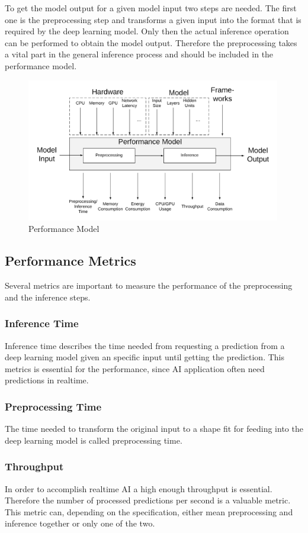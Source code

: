 To get the model output for a given model input two steps are needed. The first one is the preprocessing step and transforms a given input into the format that is required by the deep learning model. Only then the actual inference operation can be performed to obtain the model output. Therefore the preprocessing takes a vital part in the general inference process and should be included in the performance model.
\begin{figure}[H]
\centering
\includegraphics[width=0.99\textwidth]{./Bilder/trade_offs.png}
\caption{Performance Model}
\label{fig:perfmodel}
\end{figure}
\subsection{Performance Metrics}
Several metrics are important to measure the performance of the preprocessing and the inference steps. 

 
\subsubsection{Inference Time}
Inference time describes the time needed from requesting a prediction from a deep learning model given an specific input until getting the prediction.
This metrics is essential for the performance, since AI application often need predictions in realtime.
\subsubsection{Preprocessing Time}
The time needed to transform the original input to a shape fit for feeding into the deep learning model is called preprocessing time.

\subsubsection{Throughput}
In order to accomplish realtime AI a high enough throughput is essential. Therefore the number of processed predictions per second is a valuable metric. This metric can, depending on the specification, either mean preprocessing and inference together or only one of the two.
